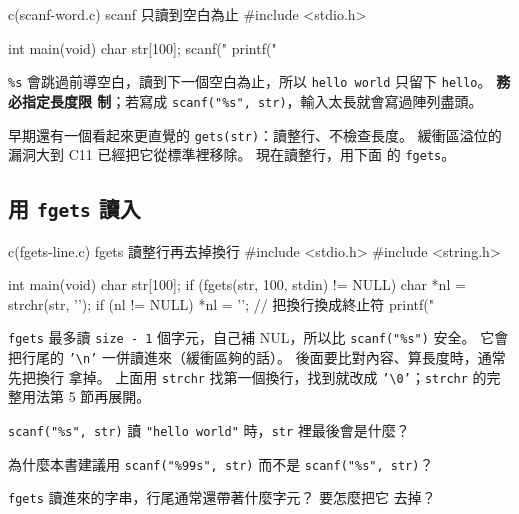 \begin{example}{c}{(scanf-word.c) scanf 只讀到空白為止}
#include <stdio.h>

int main(void) {
    char str[100];
    scanf("%
    printf("%
}
\end{example}


\texttt{\%s} 會跳過前導空白，讀到下一個空白為止，所以
\texttt{hello world} 只留下 \texttt{hello}。 \textbf{務必指定長度限
制}；若寫成 \texttt{scanf("\%s", str)}，輸入太長就會寫過陣列盡頭。

早期還有一個看起來更直覺的 \texttt{gets(str)}：讀整行、不檢查長度。
緩衝區溢位的漏洞大到 C11 已經把它從標準裡移除。 現在讀整行，用下面
的 \texttt{fgets}。

\subsection{用 \texttt{fgets} 讀入}

\begin{example}{c}{(fgets-line.c) fgets 讀整行再去掉換行}
#include <stdio.h>
#include <string.h>

int main(void) {
    char str[100];
    if (fgets(str, 100, stdin) != NULL) {
        char *nl = strchr(str, '\n');
        if (nl != NULL) {
            *nl = '\0';        // 把換行換成終止符
        }
        printf("%
    }
}
\end{example}


\texttt{fgets} 最多讀 \texttt{size - 1} 個字元，自己補 NUL，所以比
\texttt{scanf("\%s")} 安全。 它會把行尾的 \texttt{'\textbackslash n'}
一併讀進來（緩衝區夠的話）。 後面要比對內容、算長度時，通常先把換行
拿掉。 上面用 \texttt{strchr} 找第一個換行，找到就改成
\texttt{'\textbackslash 0'}；\texttt{strchr} 的完整用法第 5 節再展開。


\begin{drills}[label=drills:str-io]
\item \texttt{scanf("\%s", str)} 讀 \texttt{"hello world"} 時，\texttt{str}
裡最後會是什麼？
\item 為什麼本書建議用 \texttt{scanf("\%99s", str)} 而不是
\texttt{scanf("\%s", str)}？
\item \texttt{fgets} 讀進來的字串，行尾通常還帶著什麼字元？ 要怎麼把它
去掉？
\end{drills}

